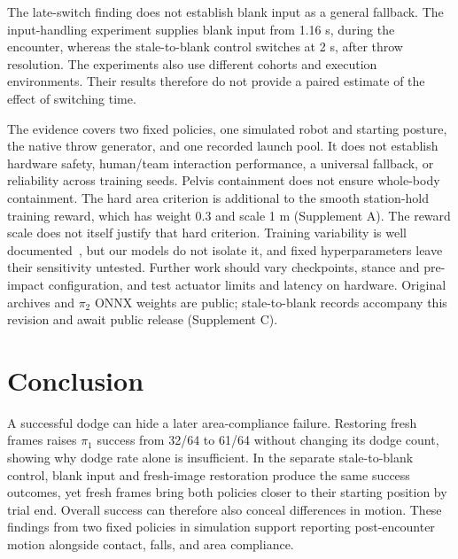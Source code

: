 \documentclass[conference]{IEEEtran}
\begin{document}
The late-switch finding does not establish blank input as a general fallback.
The input-handling experiment supplies blank input from 1.16 s, during the
encounter, whereas the stale-to-blank control switches at 2 s, after throw
resolution. The experiments also use different cohorts and execution
environments. Their results therefore do not provide a paired estimate of the
effect of switching time.

The evidence covers two fixed policies, one simulated robot and starting
posture, the native throw generator, and one recorded launch pool. It does not
establish hardware safety, human/team interaction performance, a universal
fallback, or reliability across training seeds. Pelvis containment does not
ensure whole-body containment. The hard area criterion is additional to the
smooth station-hold training reward, which has weight 0.3 and scale 1 m
(Supplement A). The reward scale does not itself justify that hard criterion.
Training variability is
well documented~\cite{rlrepro}, but our models do not isolate it, and fixed
hyperparameters leave their sensitivity untested. Further work should vary
checkpoints, stance and pre-impact configuration, and test actuator limits and
latency on hardware. Original archives and $\pi_2$ ONNX weights are public;
stale-to-blank records accompany this revision and await public release
(Supplement C).

\section{Conclusion}
A successful dodge can hide a later area-compliance failure. Restoring fresh
frames raises $\pi_1$ success from 32/64 to 61/64 without changing its dodge
count, showing why dodge rate alone is insufficient. In the separate
stale-to-blank control, blank input and fresh-image restoration produce the
same success outcomes, yet fresh frames bring both policies closer to their
starting position by trial end. Overall success can therefore also conceal
differences in motion. These findings from two fixed policies in simulation
support reporting post-encounter motion alongside contact, falls, and area
compliance.

\clearpage
\label{page:references}


\end{document}
